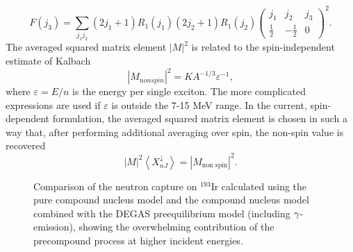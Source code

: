 \begin{equation}
F(j_{3})=\sum_{j_{1}j_{2}}(2j_{1}+1)R_{1}(j_{1})(2j_{2}+1)R_{1}(j_{2})\left(
\begin{array}{ccc}
j_{1} & j_{2} & j_{3} \\
\frac{1}{2} & -\frac{1}{2} & 0%
\end{array}%
\right) ^{2}.
\end{equation}%
The averaged squared matrix element $|M|^{2}$ is related to the
spin-independent estimate of Kalbach \cite{Kalbach}
\begin{equation}
|M_{nonspin}|^{2}=KA^{-1/3}\varepsilon ^{-1},
\end{equation}%
\noindent where $\varepsilon =E/n$ is the energy per single exciton. The
more complicated expressions \cite{Kalbach} are used if $\varepsilon $ is
outside the 7-15 MeV range. In the current, spin-dependent formulation, the
averaged squared matrix element is chosen in such a way that, after
performing additional averaging over spin, the non-spin value is recovered
\begin{equation}
|M|^{2}\left\langle X_{nJ}^{\downarrow }\right\rangle =|M_{\text{non spin}%
}|^{2}.
\end{equation}%
\begin{figure}[tbph]
\caption{Comparison of the neutron capture on $^{193}$Ir calculated using
the pure compound nucleus model and the compound nucleus model
combined with the DEGAS preequilibrium
model (including $\protect\gamma $-emission), showing the
overwhelming contribution of the precompound process at higher incident
energies. }
\label{ir193}
\end{figure}


